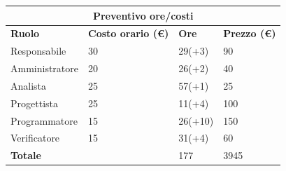 \documentclass[a4paper, 12pt]{article}
\begin{document}
\begin{center}
	\begin{tabularx}{\textwidth}{|X|X|X|X|}
		\hline
		\multicolumn{4}{|c|}{\textbf{Preventivo ore/costi}}                                      \\
		\hline
		\hline
		\textbf{Ruolo}  & \textbf{Costo orario (\euro)} & \textbf{Ore} & \textbf{Prezzo (\euro)} \\
		\hline
		Responsabile    & 30                            & 29(+3)       & 90                      \\
		\hline
		Amministratore  & 20                            & 26(+2)       & 40                       \\
		\hline
		Analista        & 25                            & 57(+1)       & 25                       \\
		\hline
		Progettista     & 25                            & 11(+4)       & 100                     \\
		\hline
		Programmatore   & 15                            & 26(+10)       & 150                     \\
		\hline
		Verificatore    & 15                            & 31(+4)       & 60                      \\
		\hline
		\hline
		\textbf{Totale} &                               & 177          & 3945                   \\
		\hline
	\end{tabularx}\\[8pt]
	\mbox{}\\
\end{center}
\end{document}
